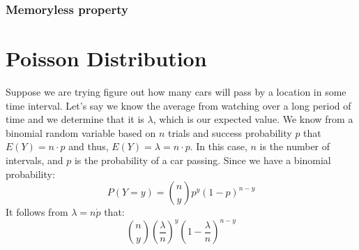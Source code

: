 \documentclass{article}
\theoremstyle{plain}
\theoremstyle{definition}
\theoremstyle{remark}
\begin{document}
\subsubsection{Memoryless property}

\section{Poisson Distribution}
Suppose we are trying figure out how many cars will pass by a location in some time interval. Let's say we know the average from watching over a long period of time and we determine that it is $\lambda$, which is our expected value. We know from a binomial random variable based on $n$ trials and success probability $p$ that $E(Y) = n \cdot p$ and thus, $E(Y) = \lambda = n \cdot p$. In this case, $n$ is the number of intervals, and $p$ is the probability of a car passing. Since we have a binomial probability:
$$
P(Y = y) = \displaystyle {n \choose y} p^y (1 - p)^{n-y}
$$
It follows from $\lambda = n \dot p$ that:
$$
{n \choose y}%
%
\left( 
  \frac{\lambda}{n} 
\right)^{y}%
%
\left(
  1 - \frac{\lambda}{n}
\right)^{n-y}
$$
\end{document}
